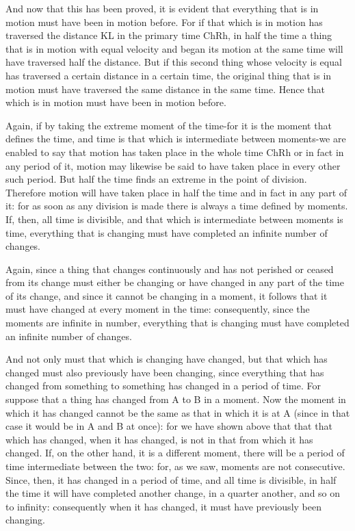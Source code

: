 And now that this has been proved, it is evident that everything that
is in motion must have been in motion before. For if that which is
in motion has traversed the distance KL in the primary time ChRh,
in half the time a thing that is in motion with equal velocity and
began its motion at the same time will have traversed half the distance.
But if this second thing whose velocity is equal has traversed a certain
distance in a certain time, the original thing that is in motion must
have traversed the same distance in the same time. Hence that which
is in motion must have been in motion before. 

Again, if by taking the extreme moment of the time-for it is the moment
that defines the time, and time is that which is intermediate between
moments-we are enabled to say that motion has taken place in the whole
time ChRh or in fact in any period of it, motion may likewise be said
to have taken place in every other such period. But half the time
finds an extreme in the point of division. Therefore motion will have
taken place in half the time and in fact in any part of it: for as
soon as any division is made there is always a time defined by moments.
If, then, all time is divisible, and that which is intermediate between
moments is time, everything that is changing must have completed an
infinite number of changes. 

Again, since a thing that changes continuously and has not perished
or ceased from its change must either be changing or have changed
in any part of the time of its change, and since it cannot be changing
in a moment, it follows that it must have changed at every moment
in the time: consequently, since the moments are infinite in number,
everything that is changing must have completed an infinite number
of changes. 

And not only must that which is changing have changed, but that which
has changed must also previously have been changing, since everything
that has changed from something to something has changed in a period
of time. For suppose that a thing has changed from A to B in a moment.
Now the moment in which it has changed cannot be the same as that
in which it is at A (since in that case it would be in A and B at
once): for we have shown above that that that which has changed, when
it has changed, is not in that from which it has changed. If, on the
other hand, it is a different moment, there will be a period of time
intermediate between the two: for, as we saw, moments are not consecutive.
Since, then, it has changed in a period of time, and all time is divisible,
in half the time it will have completed another change, in a quarter
another, and so on to infinity: consequently when it has changed,
it must have previously been changing. 

